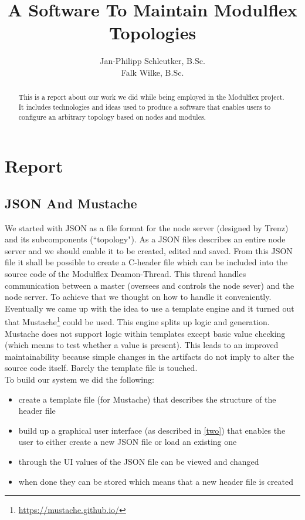 \documentclass[10pt,a4paper]{report}
\begin{document}
	\title{A Software To Maintain Modulflex Topologies}
	\author{Jan-Philipp Schleutker, B.Sc.\\Falk Wilke, B.Sc.}
	\maketitle
	\begin{abstract}
		This is a report about our work we did while being employed in the Modulflex project. 
		It includes technologies and ideas used to produce a software that enables users to configure an arbitrary topology based on nodes and modules. 
	\end{abstract}
	\tableofcontents
	
	\chapter{Report}
	
	\section{JSON And Mustache}
	
	We started with JSON as a file format for the node server (designed by Trenz) and its subcomponents (``topology"). 
	As a JSON files describes an entire node server and we should enable it to be created, edited and saved. From this JSON file it shall be possible to create a C-header file which can be included into the source code of the Modulflex Deamon-Thread. This thread handles communication between a master (oversees and controls the node sever) and the node server.
	To achieve that we thought on how to handle it conveniently. Eventually we came up with the idea to use a template engine and it turned out that Mustache\footnote{\url{https://mustache.github.io/}} could be used. This engine splits up logic and generation. Mustache does not support logic within templates except basic value checking (which means to test whether a value is present). This leads to an improved maintainability because simple changes in the artifacts do not imply to alter the source code itself. Barely the template file is touched. \\
	To build our system we did the following:
	
	\begin{itemize}
		\item create a template file (for Mustache) that describes the structure of the header file
		\item build up a graphical user interface (as described in \ref{two}) that enables the user to either create a new JSON file or load an existing one
		\item through the UI values of the JSON file can be viewed and changed
		\item when done they can be stored which means that a new header file is created  
	\end{itemize}
	
\end{document}
